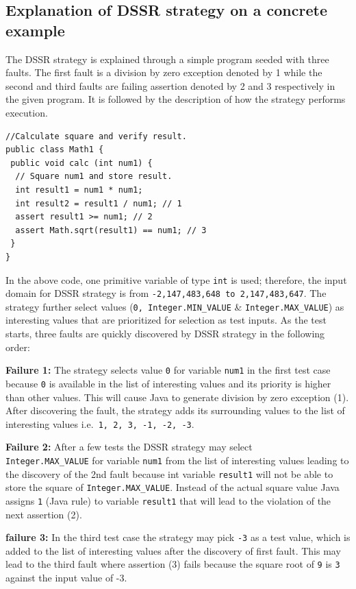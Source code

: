 \documentclass[conference]{IEEEtran}
\begin{document}


\subsection{Explanation of DSSR strategy on a concrete example}
The DSSR strategy is explained through a simple program seeded with three faults. The first fault is a division by zero exception denoted by 1 while the second and third faults are failing assertion denoted by 2 and 3 respectively in the given program. It is followed by the description of how the strategy performs execution.

\begin{lstlisting}
//Calculate square and verify result. 
public class Math1 {
 public void calc (int num1) {
  // Square num1 and store result. 
  int result1 = num1 * num1;
  int result2 = result1 / num1; // 1
  assert result1 >= num1; // 2
  assert Math.sqrt(result1) == num1; // 3
 } 
}
\end{lstlisting}
In the above code, one primitive variable of type \verb+int+ is used; therefore, the input domain for DSSR strategy is from \verb+-2,147,483,648 to 2,147,483,647+. The strategy further select values (\verb+0, Integer.MIN_VALUE+ \& \verb+Integer.MAX_VALUE+) as interesting values that are prioritized for selection as test inputs. 
As the test starts, three faults are quickly discovered by DSSR strategy in the following order:

\noindent \textbf{Failure 1:} The strategy selects value \verb+0+ for variable \verb+num1+  in the first test case because \verb+0+ is available in the list of interesting values and its priority is higher than other values. This will cause Java to generate division by zero exception (1). After discovering the fault, the strategy adds its surrounding values to the list of interesting values i.e.\verb+ 1, 2, 3, -1, -2, -3+. 

\noindent \textbf{Failure 2:} After a few tests the DSSR strategy may select \\ \verb+Integer.MAX_VALUE+ for variable \verb+num1+  from the list of interesting values leading to the discovery of the 2nd fault because int variable \verb+result1+ will not be able to store the square of \verb+Integer.MAX_VALUE+. Instead of the actual square value Java assigns \verb+1+ (Java rule) to variable \verb+result1+ that will lead to the violation of the next assertion (2).

\noindent \textbf{failure 3:} In the third test case the strategy may pick \verb+-3+ as a test value, which is added to the list of interesting values after the discovery of first fault. This may lead to the third fault where assertion (3) fails because the square root of \verb+9+ is \verb+3+ against the input value of -3.
\end{document}
